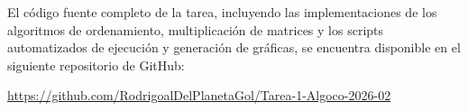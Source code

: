 El código fuente completo de la tarea, incluyendo las implementaciones de los algoritmos de ordenamiento, multiplicación de matrices y los scripts automatizados de ejecución y generación de gráficas, se encuentra disponible en el siguiente repositorio de GitHub:

\url{https://github.com/RodrigoalDelPlanetaGol/Tarea-1-Algoco-2026-02}